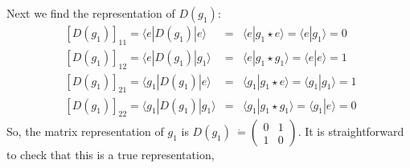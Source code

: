 \documentclass[12pt,epsf]{article}
\def\nolabel{\nonumber }
\def\nolabel{\nonumber }
\begin{document}
Next we find the representation of $D(g_1)$:
\begin{eqnarray}
\;[D(g_1)]_{11} = \langle e|D(g_1)|e\rangle &=& \langle e|g_1\star
e\rangle = \langle e| g_1\rangle = 0 \nolabel \\
\;[D(g_1)]_{12} = \langle e|D(g_1)|g_1\rangle &=& \langle e|g_1\star
g_1\rangle = \langle e| e\rangle = 1 \nolabel \\
\;[D(g_1)]_{21} = \langle g_1|D(g_1)|e\rangle &=& \langle g_1|g_1\star
e\rangle = \langle g_1|g_1\rangle = 1 \nolabel \\
\;[D(g_1)]_{22} = \langle g_1|D(g_1)|g_1\rangle &=& \langle
g_1|g_1\star g_1\rangle = \langle g_1|e\rangle = 0\nolabel 
\end{eqnarray}
So, the matrix representation of $g_1$ is $D(g_1)~\dot{=}
\begin{pmatrix}
0 & 1 \\ 1 & 0
\end{pmatrix}$.  It is straightforward to check that this is a true
representation,
\end{document}
